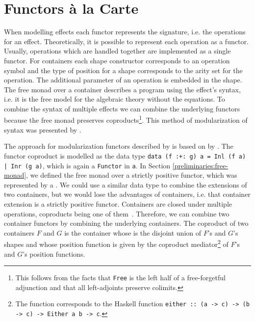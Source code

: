 \section{Functors {\`{a}} la Carte}
\label{first-order:functor}

When modelling effects each functor represents the signature, i.e. the operations for
an effect.
Theoretically, it is possible to represent each operation as a functor.
Usually, operations which are handled together are implemented as a single functor.
For containers each shape constructor corresponds to an operation symbol and the
type of position for a shape corresponds to the arity set for the operation.
The additional parameter of an operation is embedded in the shape.
The free monad over a container describes a program using the effect's syntax,
i.e. it is the free model for the algebraic theory without the equations.
To combine the syntax of multiple effects we can combine the underlying
functors because the free monad preserves coproducts\footnote{This follows from
the facts that \texttt{Free} is the left half of a free-forgetful adjunction and
that all left-adjoints preserve colimits.}.
This method of modularization of syntax was presented by
\textcite{DBLP:journals/jfp/Swierstra08}.

The approach for modularization functors described by
\textcite{DBLP:conf/haskell/WuSH14} is based on
 by
\textcite{DBLP:journals/jfp/Swierstra08}.
The functor coproduct is modelled as the data type
\texttt{data (f :+: g) a = Inl (f a) | Inr (g a)},
which is again a \texttt{Functor} in \texttt{a}.
In Section \ref{preliminaries:free-monad}, we defined the free monad over
a strictly positive functor, which was represented by a
.
We could use a similar data type to combine the extensions of two containers,
but we would lose the advantages of containers, i.e. that container extension is
a strictly positive functor.
Containers are closed under multiple operations, coproducts being one of
them~\cite{DBLP:conf/fossacs/AbbottAG03}.
Therefore, we can combine two container functors by combining the underlying
containers.
The coproduct of two containers $F$ and $G$ is the container whose
 is the disjoint union of $F$'s and $G$'s shapes and whose
position function  is given by the coproduct
mediator\footnote{The function \AgdaFunction{[\_,\_]} corresponds to the Haskell
function \texttt{either :: (a -> c) -> (b -> c) -> Either a b ->
c}.} of $F$'s and $G$'s position functions.

